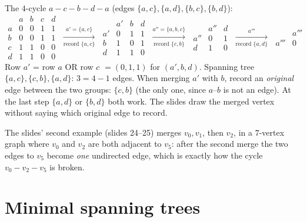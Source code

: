 \documentclass{fkt-notes}
\newcommand{\src}[1]{\par\noindent{\small\itshape Source: #1}\par\smallskip}
\newcommand{\kolman}[1]{\setcounter{section}{\numexpr#1-1\relax}}
\theoremstyle{definition}
\begin{document}
\begin{example}
  The $4$-cycle $a-c-b-d-a$ (edges $\{a,c\},\{a,d\},\{b,c\},\{b,d\}$):
  \[
    \begin{array}{c|cccc}
        & a & b & c & d \\\hline
      a & 0 & 0 & 1 & 1 \\
      b & 0 & 0 & 1 & 1 \\
      c & 1 & 1 & 0 & 0 \\
      d & 1 & 1 & 0 & 0
    \end{array}
    \;\xrightarrow[\text{record }\{a,c\}]{a'=\{a,c\}}\;
    \begin{array}{c|ccc}
         & a' & b & d \\\hline
      a' & 0  & 1 & 1 \\
      b  & 1  & 0 & 1 \\
      d  & 1  & 1 & 0
    \end{array}
    \;\xrightarrow[\text{record }\{c,b\}]{a''=\{a,b,c\}}\;
    \begin{array}{c|cc}
          & a'' & d \\\hline
      a'' & 0   & 1 \\
      d   & 1   & 0
    \end{array}
    \;\xrightarrow[\text{record }\{a,d\}]{a'''}\;
    \begin{array}{c|c}
           & a''' \\\hline
      a''' & 0
    \end{array}
  \]
  Row $a'$ = row $a$ OR row $c$ $=(0,1,1)$ for $(a',b,d)$. Spanning tree
  $\{a,c\},\{c,b\},\{a,d\}$: $3=4-1$ edges. When merging $a'$ with $b$,
  record an \emph{original} edge between the two groups: $\{c,b\}$ (the
  only one, since $a$--$b$ is not an edge). At the last step $\{a,d\}$ or
  $\{b,d\}$ both work. The slides draw the merged vertex without saying
  which original edge to record.
\end{example}
\noindent The slides' second example (slides 24--25) merges $v_0,v_1$,
then $v_2$, in a $7$-vertex graph where $v_0$ and $v_2$ are both adjacent
to $v_5$: after the second merge the two edges to $v_5$ become \emph{one}
undirected edge, which is exactly how the cycle $v_0-v_2-v_5$ is broken.

\kolman{5}
\section{Minimal spanning trees}\src{Kolman 7.5}
%
\end{document}
